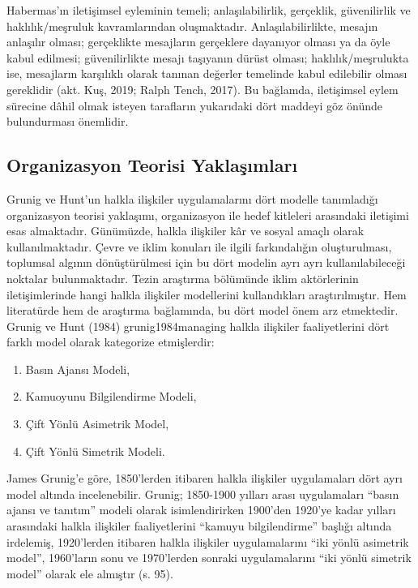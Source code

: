 \documentclass[
]{book}
\providecommand{\tightlist}{%
  \setlength{\itemsep}{0pt}\setlength{\parskip}{0pt}}
\begin{document}
Habermas'ın iletişimsel eyleminin temeli; anlaşılabilirlik, gerçeklik, güvenilirlik ve haklılık/meşruluk kavramlarından oluşmaktadır. Anlaşılabilirlikte, mesajın anlaşılır olması; gerçeklikte mesajların gerçeklere dayanıyor olması ya da öyle kabul edilmesi; güvenilirlikte mesajı taşıyanın dürüst olması; haklılık/meşrulukta ise, mesajların karşılıklı olarak tanınan değerler temelinde kabul edilebilir olması gereklidir (akt. Kuş, 2019; Ralph Tench, 2017). Bu bağlamda, iletişimsel eylem sürecine dâhil olmak isteyen tarafların yukarıdaki dört maddeyi göz önünde bulundurması önemlidir.

\hypertarget{organizasyon-teorisi-yaklaux15fux131mlarux131}{%
\subsection{Organizasyon Teorisi Yaklaşımları}\label{organizasyon-teorisi-yaklaux15fux131mlarux131}}

Grunig ve Hunt'un halkla ilişkiler uygulamalarını dört modelle tanımladığı organizasyon teorisi yaklaşımı, organizasyon ile hedef kitleleri arasındaki iletişimi esas almaktadır. Günümüzde, halkla ilişkiler kâr ve sosyal amaçlı olarak kullanılmaktadır. Çevre ve iklim konuları ile ilgili farkındalığın oluşturulması, toplumsal algının dönüştürülmesi için bu dört modelin ayrı ayrı kullanılabileceği noktalar bulunmaktadır. Tezin araştırma bölümünde iklim aktörlerinin iletişimlerinde hangi halkla ilişkiler modellerini kullandıkları araştırılmıştır. Hem literatürde hem de araştırma bağlamında, bu dört model önem arz etmektedir.
Grunig ve Hunt (1984) grunig1984managing halkla ilişkiler faaliyetlerini dört farklı model olarak kategorize etmişlerdir:

\begin{enumerate}
\def\labelenumi{\arabic{enumi}.}
\tightlist
\item
  Basın Ajansı Modeli,
\item
  Kamuoyunu Bilgilendirme Modeli,
\item
  Çift Yönlü Asimetrik Model,
\item
  Çift Yönlü Simetrik Modeli.
\end{enumerate}

James Grunig'e göre, 1850'lerden itibaren halkla ilişkiler uygulamaları dört ayrı model altında incelenebilir. Grunig; 1850-1900 yılları arası uygulamaları ``basın ajansı ve tanıtım'' modeli olarak isimlendirirken 1900'den 1920'ye kadar yılları arasındaki halkla ilişkiler faaliyetlerini ``kamuyu bilgilendirme'' başlığı altında irdelemiş, 1920'lerden itibaren halkla ilişkiler uygulamalarını ``iki yönlü asimetrik model'', 1960'ların sonu ve 1970'lerden sonraki uygulamalarını ``iki yönlü simetrik model'' olarak ele almıştır (s. 95). \citep{peltekoglu2016halkla}
\end{document}
